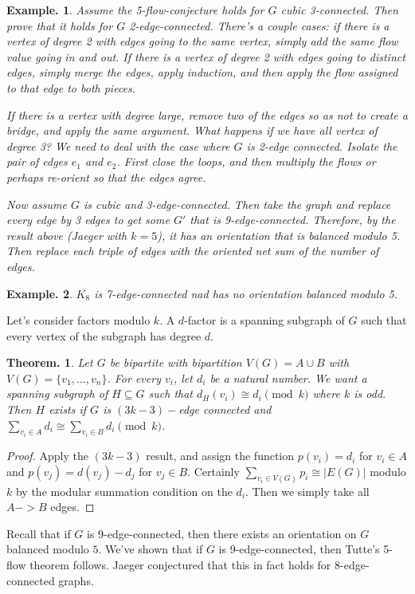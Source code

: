 \documentclass[11pt, a4paper]{memoir}
\theoremstyle{change}
\newtheorem{theorem}{Theorem.}[section]
\theoremstyle{plain}
\theoremstyle{nonumberplain}
\newtheorem{example}{Example.}
\newtheorem{proof}{Proof}
\numberwithin{equation}{section}
\begin{document}
\begin{example}
    Assume the 5-flow-conjecture holds for $G$ cubic 3-connected.
    Then prove that it holds for $G$ 2-edge-connected.
    There's a couple cases: if there is a vertex of degree 2 with edges going to the same vertex, simply add the same flow value going in and out.
    If there is a vertex of degree 2 with edges going to distinct edges, simply merge the edges, apply induction, and then apply the flow assigned to that edge to both pieces.

    If there is a vertex with degree large, remove two of the edges so as not to create a bridge, and apply the same argument.
    What happens if we have all vertex of degree 3?
    We need to deal with the case where $G$ is 2-edge connected.
    Isolate the pair of edges $e_1$ and $e_2$.
    First close the loops, and then multiply the flows or perhaps re-orient so that the edges agree.

    Now assume $G$ is cubic and 3-edge-connected.
    Then take the graph and replace every edge by 3 edges to get some $G'$ that is 9-edge-connected.
    Therefore, by the result above (Jaeger with $k=5$), it has an orientation that is balanced modulo 5.
    Then replace each triple of edges with the oriented net sum of the number of edges.
\end{example}
\begin{example}
    $K_8$ is 7-edge-connected nad has no orientation balanced modulo 5.
\end{example}
Let's consider factors modulo $k$.
A $d$-factor is a spanning subgraph of $G$ such that every vertex of the subgraph has degree $d$.
\begin{theorem}
    Let $G$ be bipartite with bipartition $V(G)=A\cup B$ with $V(G)=\{v_1,\ldots,v_n\}$.
    For every $v_i$, let $d_i$ be a natural number.
    We want a spanning subgraph of $H\subseteq G$ such that $d_H(v_i)\cong d_i\pmod{k}$ where $k$ is odd.
    Then $H$ exists if $G$ is $(3k-3)-$edge connected and $\sum_{v_i\in A}d_i\cong\sum_{v_i\in B}d_i\pmod{k}$.
\end{theorem}
\begin{proof}
    Apply the $(3k-3)$ result, and assign the function $p(v_i)=d_i$ for $v_i\in A$ and $p(v_j)=d(v_j)-d_j$ for $v_j\in B$.
    Certainly $\sum_{v_i\in V(G)}p_i\cong|E(G)|$ modulo $k$ by the modular summation condition on the $d_i$.
    Then we simply take all $A->B$ edges.
\end{proof}
Recall that if $G$ is 9-edge-connected, then there exists an orientation on $G$ balanced modulo $5$.
We've shown that if $G$ is 9-edge-connected, then Tutte's 5-flow theorem follows.
Jaeger conjectured that this in fact holds for 8-edge-connected graphs.
\end{document}
